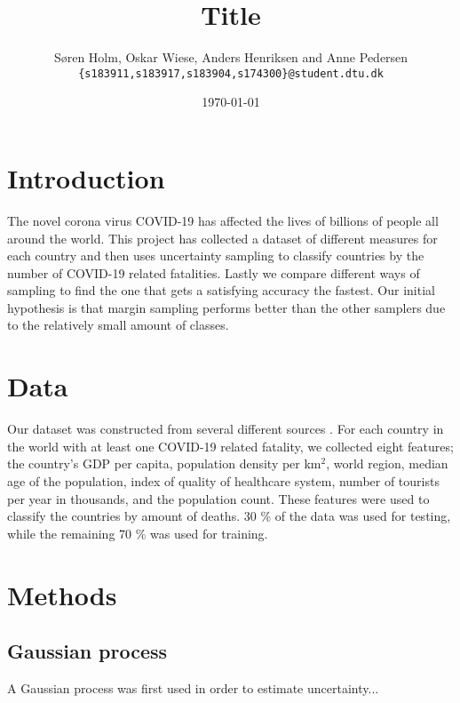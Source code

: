 \documentclass[12pt,fleqn]{article}
\title{\vspace*{-3.75cm}Title}
\author{Søren Holm, Oskar Wiese, Anders Henriksen and Anne Pedersen \\
	\small {\texttt{\{s183911,s183917,s183904,s174300\}@student.dtu.dk}}}
\date{\today}
\begin{document}
	
	\maketitle
	 
	
	\begin{abstract} %
		
	\end{abstract}
	
	\begin{multicols}{2}
		
		
		\section{Introduction} %
		The novel corona virus COVID-19 has affected the lives of billions of people all around the world. This project has collected a dataset of different measures for each country and then uses uncertainty sampling to classify countries by the number of COVID-19 related fatalities. Lastly we compare different ways of sampling to find the one that gets a satisfying accuracy the fastest. Our initial hypothesis is that margin sampling performs better than the other samplers due to the relatively small amount of classes. 
		
		\section{Data} 
		Our dataset was constructed from several different sources \cite{density, corona, alder, bnp, region, healthcare, turist}. For each country in the world with at least one COVID-19 related fatality, we collected eight features; the country's GDP per capita, population density per km$^2$, world region, median age of the population, index of quality of healthcare system, number of tourists per year in thousands, and the population count. These features were used to classify the countries by amount of deaths. 30 \% of the data was used for testing, while the remaining 70 \% was used for training. %

		\section{Methods}
		\subsection{Gaussian process} %
		A Gaussian process was first used in order to estimate uncertainty...
		

\end{multicols}
\end{document}
